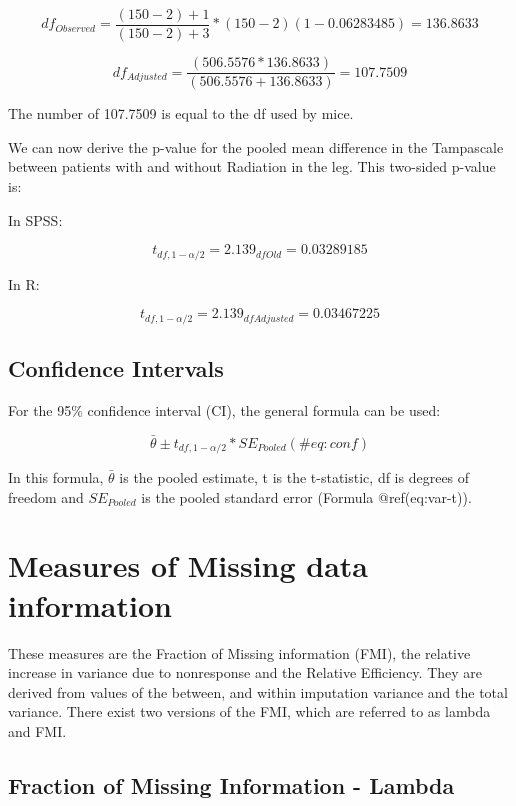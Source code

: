 \documentclass[
]{book}
\begin{document}
\[df_{Observed} = \frac{(150-2)+1}{(150-2)+3}*(150-2)(1- 0.06283485)=136.8633\]

\[df_{Adjusted} = \frac{(506.5576* 136.8633)}{(506.5576+ 136.8633)}=107.7509\]

The number of 107.7509 is equal to the df used by mice.

We can now derive the p-value for the pooled mean difference in the
Tampascale between patients with and without Radiation in the leg. This
two-sided p-value is:

In SPSS:

\[t_{df,1-\alpha/2}=2.139_{df{Old}}=0.03289185\]

In R:

\[t_{df,1-\alpha/2}=2.139_{df{Adjusted}}=0.03467225\]

\hypertarget{confidence-intervals}{%
\section{Confidence Intervals}\label{confidence-intervals}}

For the 95\% confidence interval (CI), the general formula can be used:

\begin{equation}
\bar{\theta} ± t_{df,1-\alpha/2} * SE_{Pooled}
  (\#eq:conf)
\end{equation}

In this formula, \(\bar{\theta}\) is the pooled estimate, t is the
t-statistic, df is degrees of freedom and \(SE_{Pooled}\) is the pooled
standard error (Formula @ref(eq:var-t)).

\hypertarget{measures-of-missing-data-information}{%
\chapter{Measures of Missing data
information}\label{measures-of-missing-data-information}}

These measures are the Fraction of Missing information (FMI), the
relative increase in variance due to nonresponse and the Relative
Efficiency. They are derived from values of the between, and within
imputation variance and the total variance. There exist two versions of
the FMI, which are referred to as lambda and FMI.

\hypertarget{fraction-of-missing-information---lambda}{%
\section{Fraction of Missing Information -
Lambda}\label{fraction-of-missing-information---lambda}}
\end{document}
